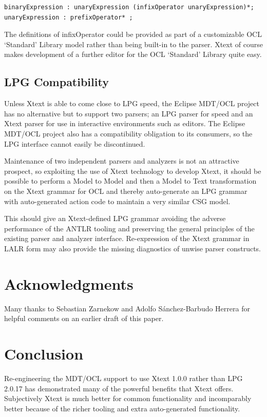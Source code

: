 \documentclass[runningheads,a4paper]{llncs}
\begin{document}
{\small\begin{verbatim}
binaryExpression : unaryExpression (infixOperator unaryExpression)*;
unaryExpression : prefixOperator* ;
\end{verbatim}}
 
The definitions of infixOperator could be provided as part of a customizable OCL `Standard' Library model rather than being built-in to the parser. Xtext of course makes development of a further editor for the OCL `Standard' Library quite easy.

\subsection{LPG Compatibility}

Unless Xtext is able to come close to LPG speed, the Eclipse MDT/OCL project has no alternative but to support two parsers; an LPG parser for speed and an Xtext parser for use in interactive environments such as editors. The Eclipse MDT/OCL project also has a compatibility obligation to its consumers, so the LPG interface cannot easily be discontinued.

Maintenance of two independent parsers and analyzers is not an attractive prospect, so exploiting the use of Xtext technology to develop Xtext, it should be possible to perform a Model to Model and then a Model to Text transformation on the Xtext grammar for OCL and thereby auto-generate an LPG grammar with auto-generated action code to maintain a very similar CSG model.

This should give an Xtext-defined LPG grammar avoiding the adverse performance of the ANTLR tooling and preserving the general principles of the existing parser and analyzer interface. Re-expression of the Xtext grammar in LALR form may also provide the missing diagnostics of unwise parser constructs.

\section{Acknowledgments}

Many thanks to Sebastian Zarnekow and Adolfo S\'anchez-Barbudo Herrera for helpful comments on an earlier draft of this paper.

\section{Conclusion}

Re-engineering the MDT/OCL support to use Xtext 1.0.0 rather than LPG 2.0.17 has demonstrated many of the powerful benefits that Xtext offers. Subjectively Xtext is much better for common functionality and incomparably better because of the  richer tooling and extra auto-generated functionality.
\end{document}
